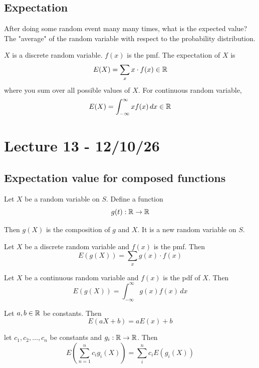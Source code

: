 \documentclass[11pt]{article}
\begin{document}
\subsection{Expectation}
After doing some random event many many times, what is the expected value? The "average" of the random variable with respect to the probability distribution.
\begin{definition}
    $X$ is a discrete random variable. $f(x)$ is the pmf. The expectation of $X$ is 
    \[
        E(X) = \sum_{x}x\cdot f(x) \in \mathbb{R}
    \]
    where you sum over all possible values of $X$. For continuous random variable,
    \[
        E(X) = \int_{-\infty}^{\infty} xf(x)\, dx \in \mathbb{R}
    \]
     
\end{definition}

\section{Lecture 13 - 12/10/26}
\subsection{Expectation value for composed functions}
\begin{definition}
    Let $X$ be a random variable on $S$. Define a function
    \[
        g(t): \mathbb{R} \rightarrow \mathbb{R} 
    \]

    Then $g(X)$ is the composition of $g$ and $X$. It is a new random variable on $S$.
\end{definition}

\begin{theorem}
    Let $X$ be a discrete random variable and $f(x)$ is the pmf. Then
    \[
        E(g(X)) = \sum_{x} g(x) \cdot f(x) 
    \]
\end{theorem}

\begin{theorem}
    Let $X$ be a continuous random variable and $f(x)$ is the pdf of $X$. Then
    \[
        E(g(X)) = \int_{-\infty}^{\infty} g(x)f(x)\, dx
    \]
    
\end{theorem}

\begin{theorem}
    Let $a, b \in \mathbb{R}$ be constants. Then
    \[
        E(aX+b) = aE(x) + b
    \]
    
\end{theorem}
\begin{theorem}
    let $c_1, c_2, \dots, c_n$ be constants and $g_i:\mathbb{R} \rightarrow \mathbb{R}$. Then
    \[
        E(\sum_{n=1}^{n}c_ig_i(X)) = \sum_{i}^{n} c_i E(g_i(X))
    \]
    
\end{theorem}
\end{document}

